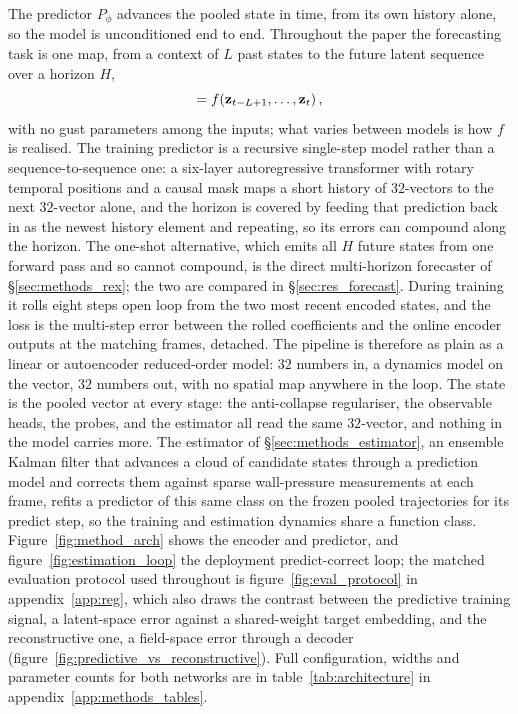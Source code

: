 The predictor $P_\phi$ advances the pooled state in time, from its own history alone, so the model is unconditioned end to end. Throughout the paper the forecasting task is one map, from a context of $L$ past states to the future latent sequence over a horizon $H$,
\begin{equation}
  [\hat{\zvec}_{t+1}, \dots, \hat{\zvec}_{t+H}]
  = f\!\left(\zvec_{t-L+1}, \dots, \zvec_{t}\right),
  \label{eq:forecast}
\end{equation}
with no gust parameters among the inputs; what varies between models is how $f$ is realised. The training predictor is a recursive single-step model rather than a sequence-to-sequence one: a six-layer autoregressive transformer with rotary temporal positions and a causal mask maps a short history of $32$-vectors to the next $32$-vector alone, and the horizon is covered by feeding that prediction back in as the newest history element and repeating, so its errors can compound along the horizon. The one-shot alternative, which emits all $H$ future states from one forward pass and so cannot compound, is the direct multi-horizon forecaster of \S\ref{sec:methods_rex}; the two are compared in \S\ref{sec:res_forecast}. During training it rolls eight steps open loop from the two most recent encoded states, and the loss is the multi-step error between the rolled coefficients and the online encoder outputs at the matching frames, detached. The pipeline is therefore as plain as a linear or autoencoder reduced-order model: $32$ numbers in, a dynamics model on the vector, $32$ numbers out, with no spatial map anywhere in the loop. The state is the pooled vector at every stage: the anti-collapse regulariser, the observable heads, the probes, and the estimator all read the same $32$-vector, and nothing in the model carries more. The estimator of \S\ref{sec:methods_estimator}, an ensemble Kalman filter that advances a cloud of candidate states through a prediction model and corrects them against sparse wall-pressure measurements at each frame, refits a predictor of this same class on the frozen pooled trajectories for its predict step, so the training and estimation dynamics share a function class. Figure~\ref{fig:method_arch} shows the encoder and predictor, and figure~\ref{fig:estimation_loop} the deployment predict-correct loop; the matched evaluation protocol used throughout is figure~\ref{fig:eval_protocol} in appendix~\ref{app:reg}, which also draws the contrast between the predictive training signal, a latent-space error against a shared-weight target embedding, and the reconstructive one, a field-space error through a decoder (figure~\ref{fig:predictive_vs_reconstructive}). Full configuration, widths and parameter counts for both networks are in table~\ref{tab:architecture} in appendix~\ref{app:methods_tables}.\re

